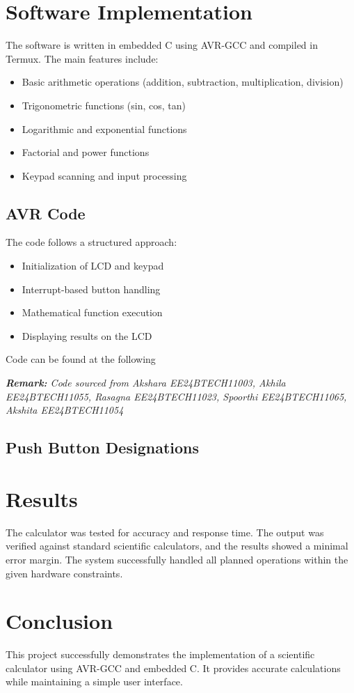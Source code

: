 \documentclass[12pt,a4paper]{article}
\begin{document}
\section{Software Implementation}
The software is written in embedded C using AVR-GCC and compiled in Termux. The main features include:
\begin{itemize}
    \item Basic arithmetic operations (addition, subtraction, multiplication, division)
    \item Trigonometric functions (sin, cos, tan)
    \item Logarithmic and exponential functions
    \item Factorial and power functions
    \item Keypad scanning and input processing
\end{itemize}

\subsection{AVR Code}
The code follows a structured approach:
\begin{itemize}
    \item Initialization of LCD and keypad
    \item Interrupt-based button handling
    \item Mathematical function execution
    \item Displaying results on the LCD
\end{itemize}

Code can be found at the following \href{hyperlink}{}

\textit{\textbf{Remark:} Code sourced from Akshara EE24BTECH11003, Akhila EE24BTECH11055, Rasagna EE24BTECH11023, Spoorthi EE24BTECH11065, Akshita EE24BTECH11054}

\subsection{Push Button Designations}


\section{Results}
The calculator was tested for accuracy and response time. The output was verified against standard scientific calculators, and the results showed a minimal error margin. The system successfully handled all planned operations within the given hardware constraints.

\section{Conclusion}
This project successfully demonstrates the implementation of a scientific calculator using AVR-GCC and embedded C. It provides accurate calculations while maintaining a simple user interface.
\end{document}
